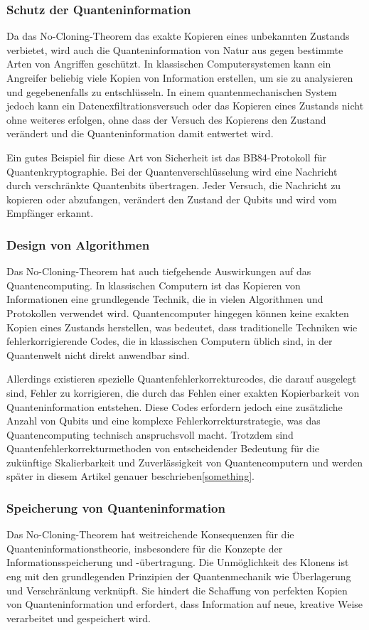 \subsubsection{Schutz der Quanteninformation}
Da das No-Cloning-Theorem das exakte Kopieren eines unbekannten Zustands verbietet,
wird auch die Quanteninformation von Natur aus gegen bestimmte Arten von Angriffen geschützt.
In klassischen Computersystemen kann ein Angreifer beliebig viele Kopien von Information erstellen,
um sie zu analysieren und gegebenenfalls zu entschlüsseln.
In einem quantenmechanischen System jedoch kann ein Datenexfiltrationsversuch oder das Kopieren eines Zustands
nicht ohne weiteres erfolgen, ohne dass der Versuch des Kopierens den Zustand verändert
und die Quanteninformation damit entwertet wird.

Ein gutes Beispiel für diese Art von Sicherheit ist das BB84-Protokoll für Quantenkryptographie.
Bei der Quantenverschlüsselung wird eine Nachricht durch verschränkte Quantenbits übertragen.
Jeder Versuch, die Nachricht zu kopieren oder abzufangen, verändert den Zustand der Qubits und wird vom Empfänger erkannt.

\subsubsection{Design von Algorithmen}

Das No-Cloning-Theorem hat auch tiefgehende Auswirkungen auf das Quantencomputing.
In klassischen Computern ist das Kopieren von Informationen eine grundlegende Technik, die in vielen Algorithmen und Protokollen verwendet wird.
Quantencomputer hingegen können keine exakten Kopien eines Zustands herstellen, was bedeutet,
dass traditionelle Techniken wie fehlerkorrigierende Codes, die in klassischen Computern üblich sind, in der Quantenwelt nicht direkt anwendbar sind.

Allerdings existieren spezielle Quantenfehlerkorrekturcodes, die darauf ausgelegt sind, Fehler zu korrigieren,
die durch das Fehlen einer exakten Kopierbarkeit von Quanteninformation entstehen.
Diese Codes erfordern jedoch eine zusätzliche Anzahl von Qubits und eine komplexe Fehlerkorrekturstrategie,
was das Quantencomputing technisch anspruchsvoll macht.
Trotzdem sind Quantenfehlerkorrekturmethoden von entscheidender Bedeutung für die zukünftige Skalierbarkeit
und Zuverlässigkeit von Quantencomputern und werden später in diesem Artikel genauer beschrieben\ref{something}.

\subsubsection{Speicherung von Quanteninformation}
Das No-Cloning-Theorem hat weitreichende Konsequenzen für die Quanteninformationstheorie,
insbesondere für die Konzepte der Informationsspeicherung und -übertragung.
Die Unmöglichkeit des Klonens ist eng mit den grundlegenden Prinzipien der Quantenmechanik wie Überlagerung und Verschränkung verknüpft.
Sie hindert die Schaffung von perfekten Kopien von Quanteninformation und erfordert, dass Information auf neue, kreative Weise verarbeitet und gespeichert wird.

